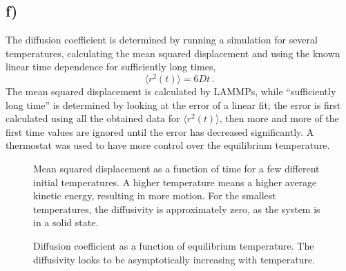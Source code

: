\documentclass[11pt,british,a4paper]{report}
\begin{document}
\subsection*{f)}
The diffusion coefficient is determined by running a simulation for several temperatures, calculating the mean squared displacement and using the known linear time dependence for sufficiently long times,
\[
    \langle r^2(t)\rangle = 6Dt\,.
\]
The mean squared displacement is calculated by LAMMPs, while ``sufficiently long time'' is determined by looking at the error of a linear fit; the error is first calculated using all the obtained data for \(\langle r^2(t)\rangle\), then more and more of the first time values are ignored until the error has decreased significantly. A thermostat was used to have more control over the equilibrium temperature.
\tikzexternaldisable
\begin{figure}[htbp]
    \centering
    \caption{Mean squared displacement as a function of time for a few different initial temperatures. A higher temperature means a higher average kinetic energy, resulting in more motion. For the smallest temperatures, the diffusivity is approximately zero, as the system is in a solid state.}%
    \label{fig:msdtime}
\end{figure}
\begin{figure}[htbp]
    \centering
    \caption{Diffusion coefficient as a function of equilibrium temperature. The diffusivity looks to be asymptotically increasing with temperature.}\label{fig:argonD}
\end{figure}
\end{document}
